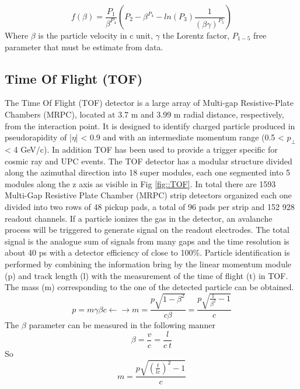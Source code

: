 \documentclass[12pt,a4paper]{book}
\begin{document}
	 \begin{equation}
	 	f(\beta) = \frac{P_1}{\beta^{P_4}} \left(P_2 - \beta^{P_4} -ln(P_3) \frac{1}{(\beta \gamma)^{P_5}} \right)
	 \end{equation}
	 Where $\beta$ is the particle velocity in c unit, $\gamma$ the Lorentz factor, $P_{1-5}$ free parameter that must be estimate from data.
	 
	 \subsection{Time Of Flight (TOF)}
	 The Time Of Flight (TOF) detector is a large array of Multi-gap Resistive-Plate Chambers (MRPC), located at 3.7 m and 3.99 m radial distance, respectively, from the interaction point. It is designed to identify charged particle produced in pseudorapidity of |$\eta$| < 0.9 and with an intermediate momentum range (0.5 < $p_\perp$ < 4 GeV/c). In addition TOF has been used to provide a trigger specific for cosmic ray and UPC events. The TOF detector has a modular structure divided along the azimuthal direction into 18 super modules, each one segmented into 5 modules along the z axis as visible in Fig \ref{fig::TOF}. In total there are 1593 Multi-Gap Resistive Plate Chamber (MRPC) strip
	 detectors organized each one divided into two rows of 48 pickup pads, a total of 96 pads per strip and 152 928 readout channels. If a particle ionizes the gas in the detector, an avalanche process will be triggered to generate signal on the readout electrodes. The total signal is the analogue sum of signals from many gaps and the time resolution is about 40 ps with a detector efficiency of close to 100\%. Particle identification is performed by combining the information bring by the linear momentum module (p) and track length (l) with the measurement of the time of flight (t) in TOF. The mass (m) corresponding to the one of the detected particle can be obtained. 
	 \begin{equation}
	 	p = m \gamma \beta c \leftarrow \rightarrow m = \frac{p \sqrt{1- \beta^2}}{c \beta} = \frac{p \sqrt{\frac{1}{\beta^2}-1}}{c}
	 \end{equation} 
	 The $\beta$ parameter can be measured in the following manner
	 \begin{equation}
	 	\beta = \frac{v}{c}=\frac{l}{c \ t}
	 \end{equation}
	 So 
	 \begin{equation}
	 	m = \frac{p \sqrt{\left( \frac{t}{l c} \right)^2-1}}{c}
	 \end{equation}
\end{document}
